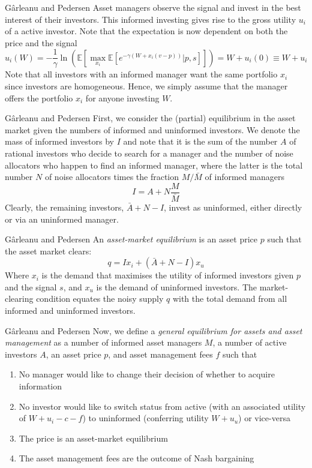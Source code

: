\documentclass[aspectratio=169,xcolor=dvipsnames]{beamer}
\begin{document}
\begin{frame}{G\^arleanu and Pedersen}
    Asset managers observe the signal and invest in the best interest of their investors. This informed investing gives rise to the gross utility $u_i$ of a active investor. Note that the expectation is now dependent on both the price and the signal
    \[
        u_i(W) = -\frac{1}{\gamma} \ln \left( \mathbb{E}\left[\max_{x_i} \mathbb{E}\left[e^{-\gamma(W + x_i(v - p))} \big| p, s\right]\right]\right) = W + u_i(0) \equiv W + u_i
    \]
    Note that all investors with an informed manager want the same portfolio $x_i$ since investors are homogeneous. Hence, we simply assume that the manager offers the portfolio $x_i$ for anyone investing $W$.
\end{frame}

\begin{frame}{G\^arleanu and Pedersen}
    First, we consider the (partial) equilibrium in the asset market given the numbers of informed and uninformed investors. We denote the mass of informed investors by $I$ and note that it is the sum of the number $A$ of rational investors who decide to search for a manager and the number of noise allocators who happen to find an informed manager, where the latter is the total number $N$ of noise allocators times the fraction $M/\bar M$ of informed managers
    \[
        I = A + N \frac{M}{\bar M}
    \]
    Clearly, the remaining investors, $\bar A + N - I$, invest as uninformed, either directly or via an uninformed manager.
\end{frame}

\begin{frame}{G\^arleanu and Pedersen}
    An \emph{asset-market equilibrium} is an asset price $p$ such that the asset market clears:
    \[
        q = I x_i + (\bar A + N - I) x_u
    \]
    Where $x_i$ is the demand that maximises the utility of informed investors given $p$ and the signal $s$, and $x_u$ is the demand of uninformed investors. The market-clearing condition equates the noisy supply $q$ with the total demand from all informed and uninformed investors.
\end{frame}

\begin{frame}{G\^arleanu and Pedersen}
    Now, we define a \emph{general equilibrium for assets and asset management} as a number of informed asset managers $M$, a number of active investors $A$, an asset price $p$, and asset management fees $f$ such that
    \begin{enumerate}
        \item No manager would like to change their decision of whether to acquire information
        \item No investor would like to switch status from active (with an associated utility of $W + u_i - c - f$) to uninformed (conferring utility $W + u_u$) or vice-versa
        \item The price is an asset-market equilibrium
        \item The asset management fees are the outcome of Nash bargaining
    \end{enumerate}
\end{frame}
\end{document}
